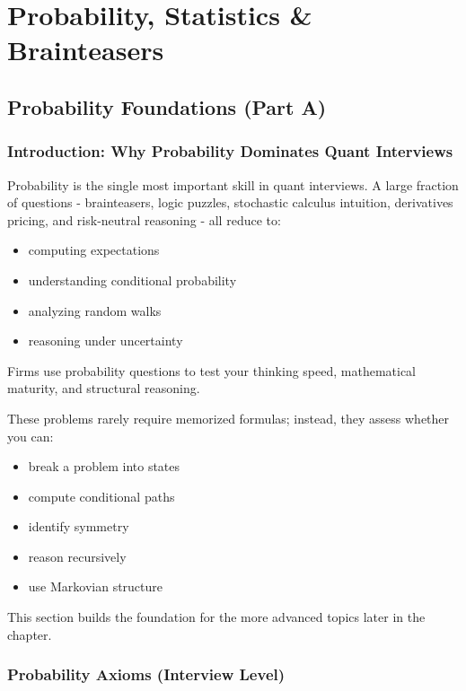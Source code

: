 \documentclass{report}
\begin{document}
\setcounter{page}{1}

\chapter{Probability, Statistics \& Brainteasers}

\section{Probability Foundations (Part A)}

\subsection*{Introduction: Why Probability Dominates Quant Interviews}

Probability is the single most important skill in quant interviews.
A large fraction of questions - brainteasers, logic puzzles, stochastic calculus intuition, derivatives pricing, and risk-neutral reasoning - all reduce to:

\begin{itemize}
    \item computing expectations
    \item understanding conditional probability
    \item analyzing random walks
    \item reasoning under uncertainty
\end{itemize}

Firms use probability questions to test your thinking speed, mathematical maturity, and structural reasoning.

These problems rarely require memorized formulas; instead, they assess whether you can:

\begin{itemize}
    \item break a problem into states
    \item compute conditional paths
    \item identify symmetry
    \item reason recursively
    \item use Markovian structure
\end{itemize}

This section builds the foundation for the more advanced topics later in the chapter.

\subsection*{Probability Axioms (Interview Level)}
\end{document}
